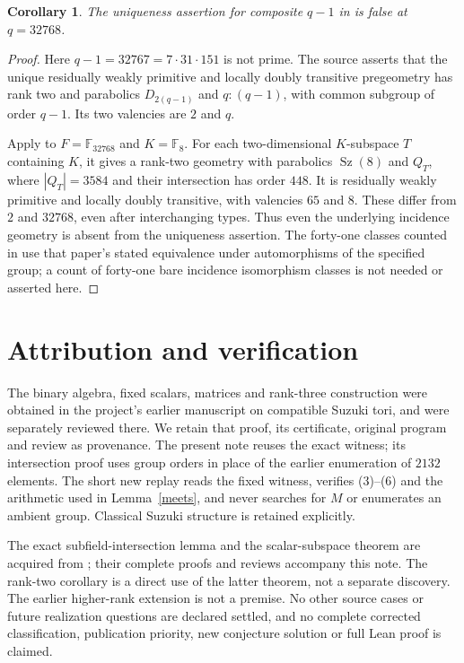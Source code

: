 \documentclass[11pt,a4paper]{article}
\newtheorem{corollary}[theorem]{Corollary}
\newcommand{\F}{\mathbb F}
\newcommand{\Sz}{\operatorname{Sz}}
\begin{document}
\begin{corollary}\label{ranktwo}
The uniqueness assertion for composite $q-1$ in
\cite[Theorem 6.1, printed p.61]{source} is false at $q=32768$.
\end{corollary}
\begin{proof}
Here $q-1=32767=7\cdot31\cdot151$ is not prime.
The source asserts that the unique residually weakly primitive and
locally doubly transitive pregeometry has rank two and parabolics
$D_{2(q-1)}$ and $q:(q-1)$, with common subgroup of order $q-1$.
Its two valencies are $2$ and $q$.

Apply \cite[Theorem 3]{scalars} to $F=\F_{32768}$ and $K=\F_8$.
For each two-dimensional $K$-subspace $T$ containing $K$, it gives
a rank-two geometry with parabolics $\Sz(8)$ and $Q_T$,
where $|Q_T|=3584$ and their intersection has order $448$.
It is residually weakly primitive and locally doubly transitive, with
valencies $65$ and $8$. These differ from $2$ and $32768$, even after
interchanging types. Thus even the underlying incidence geometry is
absent from the uniqueness assertion. The forty-one classes counted
in \cite[Corollary 5]{scalars} use that paper's stated equivalence
under automorphisms of the specified group; a count of forty-one bare
incidence isomorphism classes is not needed or asserted here.
\end{proof}

\section{Attribution and verification}
The binary algebra, fixed scalars, matrices and rank-three construction
were obtained in the project's earlier manuscript on compatible Suzuki
tori, and were separately reviewed there. We retain that proof, its
certificate, original program and review as provenance. The present
note reuses the exact witness; its intersection proof uses group orders
in place of the earlier enumeration of $2132$ elements. The short new
replay reads the fixed witness, verifies (3)--(6) and the arithmetic
used in Lemma~\ref{meets}, and never searches for $M$ or enumerates an
ambient group. Classical Suzuki structure is retained explicitly.

The exact subfield-intersection lemma and the scalar-subspace theorem
are acquired from \cite{subfields,scalars}; their complete proofs and
reviews accompany this note. The rank-two corollary is a direct use of
the latter theorem, not a separate discovery. The earlier higher-rank
extension is not a premise. No other source cases or future realization
questions are declared settled, and no complete corrected classification,
publication priority, new conjecture solution or full Lean proof is claimed.
\end{document}
